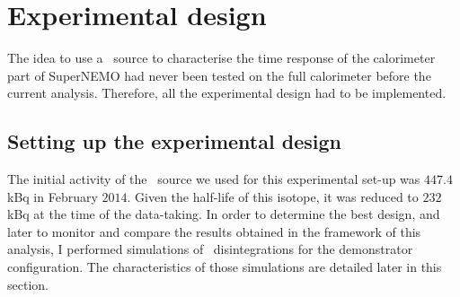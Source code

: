 \section{Experimental design}
\label{subsec:Co_setup}


The idea to use a \Co\ source to characterise the time response of the calorimeter part of SuperNEMO had never been tested on the full calorimeter before the current analysis.
Therefore, all the experimental design had to be implemented.


\subsection{Setting up the experimental design}


The initial activity of the \Co\ source we used for this experimental set-up was $447.4$ kBq in February $2014$.
Given the half-life of this isotope, it was reduced to $232$ kBq at the time of the data-taking.
In order to determine the best design, and later to monitor and compare the results obtained in the framework of this analysis, I performed simulations of \Co\ disintegrations for the demonstrator configuration.
The characteristics of those simulations are detailed later in this section.

